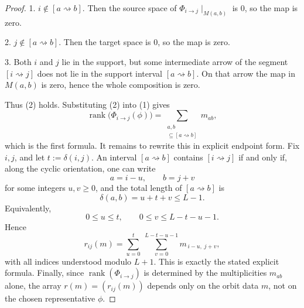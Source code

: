 \documentclass{article}
\theoremstyle{definition}
\begin{document}
\begin{proof}
1. \(i\notin [a\rightsquigarrow b]\). Then the source space of
\(\Phi_{i\to j}\!\mid_{M(a,b)}\) is \(0\), so the map is zero.

2. \(j\notin [a\rightsquigarrow b]\). Then the target space is \(0\), so the map is zero.

3. Both \(i\) and \(j\) lie in the support, but some intermediate arrow of the segment
\([i\rightsquigarrow j]\) does not lie in the support interval \([a\rightsquigarrow b]\). On that arrow the
map in \(M(a,b)\) is zero, hence the whole composition is zero.

\noindent
Thus (2) holds. Substituting (2) into (1) gives
\[
\operatorname{rank}\bigl(\Phi_{i\to j}(\phi)\bigr)
=
\sum_{\substack{a,b\\ [i\rightsquigarrow j]\subseteq [a\rightsquigarrow b]}} m_{ab},
\]
which is the first formula.
\noindent
It remains to rewrite this in explicit endpoint form. Fix \(i,j\), and let \(t:=\delta(i,j)\).
An interval \([a\rightsquigarrow b]\) contains \([i\rightsquigarrow j]\) if and only if, along the cyclic
orientation, one can write
\[
a=i-u,\qquad b=j+v
\]
for some integers \(u,v\ge 0\), and the total length of \([a\rightsquigarrow b]\) is
\[
\delta(a,b)=u+t+v\le L -1.
\]
Equivalently,
\[
0\le u\le t,\qquad 0\le v\le L-t-u - 1.
\]
Hence
\[
r_{ij}(m)
=
\sum_{u=0}^{t}\ \sum_{v=0}^{L-t-u - 1} m_{\,i-u,\;j+v},
\]
with all indices understood modulo \(L+1\). This is exactly the stated explicit formula.
\noindent
Finally, since \(\operatorname{rank}(\Phi_{i\to j})\) is determined by the multiplicities \(m_{ab}\) alone,
the array \(r(m)=(r_{ij}(m))\) depends only on the orbit data \(m\), not on the chosen representative
\(\phi\).
\end{proof}
\end{document}
